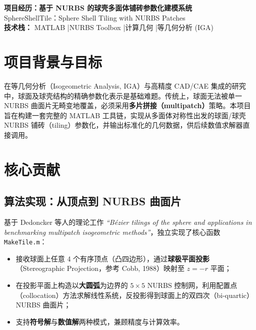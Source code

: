 \documentclass[11pt,a4paper]{article}
\begin{document}
\begin{center}
    {\LARGE\bfseries 项目经历：基于 NURBS 的球壳多面体铺砖参数化建模系统}\\[0.8em]
    {\large SphereShellTile：Sphere Shell Tiling with NURBS Patches}\\[1.2em]
    \textbf{技术栈：} MATLAB \quad|\quad NURBS Toolbox \quad|\quad 计算几何 \quad|\quad 等几何分析 (IGA)
\end{center}

\section{项目背景与目标}
在等几何分析（Isogeometric Analysis, IGA）与高精度 CAD/CAE 集成的研究中，球面及球壳结构的精确参数化表示是基础难题。传统上，球面无法被单一 NURBS 曲面片无畸变地覆盖，必须采用\textbf{多片拼接（multipatch）}策略。本项目旨在构建一套完整的 MATLAB 工具链，实现从多面体对称性出发的球面/球壳 NURBS 铺砖（tiling）参数化，并输出标准化的几何数据，供后续数值求解器直接调用。

\section{核心贡献}

\subsection{算法实现：从顶点到 NURBS 曲面片}
基于 Dedoncker 等人的理论工作 \textit{``Bézier tilings of the sphere and applications in benchmarking multipatch isogeometric methods''}，独立实现了核心函数 \texttt{MakeTile.m}：
\begin{itemize}[leftmargin=2em]
    \item 接收球面上任意 4 个有序顶点（凸四边形），通过\textbf{球极平面投影}（Stereographic Projection，参考 Cobb, 1988）映射至 $z=-r$ 平面；
    \item 在投影平面上构造以\textbf{大圆弧}为边界的 $5\times5$ NURBS 控制网，利用配置点（collocation）方法求解线性系统，反投影得到球面上的双四次（bi-quartic）NURBS 曲面片；
    \item 支持\textbf{符号解}与\textbf{数值解}两种模式，兼顾精度与计算效率。
\end{itemize}
\end{document}
